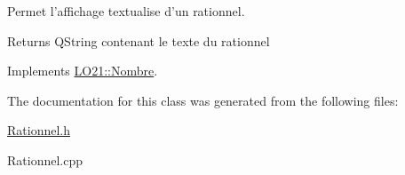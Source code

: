 \-Permet l'affichage textualise d'un rationnel. 

\begin{DoxyReturn}{\-Returns}
\-Q\-String contenant le texte du rationnel 
\end{DoxyReturn}


\-Implements \hyperlink{class_l_o21_1_1_nombre_a081a338b80d4f51048c0729597708c24}{\-L\-O21\-::\-Nombre}.



\-The documentation for this class was generated from the following files\-:\begin{DoxyCompactItemize}
\item 
\hyperlink{_rationnel_8h}{\-Rationnel.\-h}\item 
\-Rationnel.\-cpp\end{DoxyCompactItemize}
